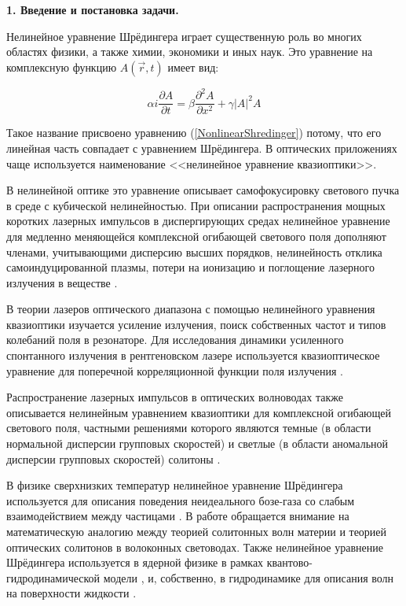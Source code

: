 \vspace{0.5em}
\noindent \textbf{1. Введение и постановка задачи.}
\vspace{0.5em}

Нелинейное уравнение Шрёдингера играет существенную роль во многих областях физики, а также химии, экономики и иных наук.
Это уравнение на комплексную функцию $A(\vec{r},t)$ имеет вид:

\begin{equation}\label{NonlinearShredinger}
    \alpha i \dfrac{\partial A}{\partial t} = \beta \dfrac{\partial^2 A}{\partial x^2} + \gamma \left|A\right|^2 A
\end{equation}

Такое название присвоено уравнению (\ref{NonlinearShredinger}) потому, что его линейная часть совпадает с уравнением Шрёдингера.
В оптических приложениях чаще используется наименование <<нелинейное уравнение квазиоптики>>.

В нелинейной оптике это уравнение описывает самофокусировку  светового пучка в среде с кубической нелинейностью.
При описании распространения мощных коротких лазерных импульсов в диспергирующих средах
нелинейное уравнение для медленно меняющейся комплексной огибающей светового поля дополняют членами,
учитывающими дисперсию высших порядков, нелинейность отклика самоиндуцированной плазмы, потери на ионизацию и поглощение лазерного излучения в веществе \cite{KandidovShlenovKosarevaReview2009}.

В теории лазеров оптического диапазона с помощью нелинейного уравнения квазиоптики изучается усиление излучения, поиск собственных частот и типов колебаний поля в резонаторе.
Для исследования динамики усиленного спонтанного излучения в рентгеновском лазере используется квазиоптическое уравнение для поперечной корреляционной функции поля излучения \cite{LadaginStarikov1998}.

Распространение лазерных импульсов в оптических волноводах также описывается нелинейным уравнением квазиоптики для комплексной огибающей светового поля,
частными решениями которого являются темные (в области нормальной дисперсии групповых скоростей) и светлые (в области аномальной дисперсии групповых скоростей) солитоны \cite{Agrawal2001,Mahankov1983,VitkovskiyFedoruk2008}.

В физике сверхнизких температур нелинейное уравнение Шрёдингера используется для описания поведения неидеального бозе-газа со слабым взаимодействием между частицами \cite{Kadomcev1997}.
В работе \cite{Belyaeva2005} обращается внимание на математическую аналогию между теорией солитонных волн материи и теорией оптических солитонов в волоконных световодах.
Также нелинейное уравнение Шрёдингера используется в ядерной физике в рамках квантово-гидродинамической модели \cite{Kartvenko1993}, и, собственно, в гидродинамике для описания волн на поверхности жидкости \cite{Zeytunyan1995}.

